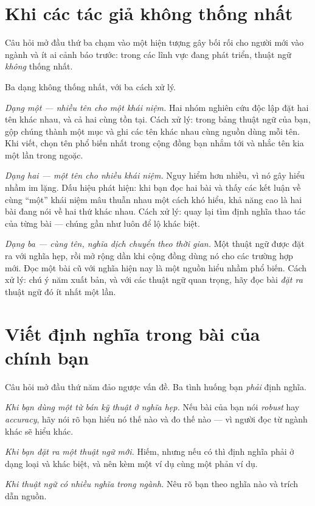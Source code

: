 \documentclass[../../english.tex]{subfiles}
\begin{document}
\section{Khi các tác giả không thống nhất}

Câu hỏi mở đầu thứ ba chạm vào một hiện tượng gây bối rối cho người mới vào ngành và ít ai cảnh báo trước: trong các lĩnh vực đang phát triển, thuật ngữ \emph{không} thống nhất.

Ba dạng không thống nhất, với ba cách xử lý.

\emph{Dạng một --- nhiều tên cho một khái niệm.} Hai nhóm nghiên cứu độc lập đặt hai tên khác nhau, và cả hai cùng tồn tại. Cách xử lý: trong bảng thuật ngữ của bạn, gộp chúng thành một mục và ghi các tên khác nhau cùng nguồn dùng mỗi tên. Khi viết, chọn tên phổ biến nhất trong cộng đồng bạn nhắm tới và nhắc tên kia một lần trong ngoặc.

\emph{Dạng hai --- một tên cho nhiều khái niệm.} Nguy hiểm hơn nhiều, vì nó gây hiểu nhầm im lặng. Dấu hiệu phát hiện: khi bạn đọc hai bài và thấy các kết luận về cùng ``một'' khái niệm mâu thuẫn nhau một cách khó hiểu, khả năng cao là hai bài đang nói về hai thứ khác nhau. Cách xử lý: quay lại tìm định nghĩa thao tác của từng bài --- chúng gần như luôn để lộ khác biệt.

\emph{Dạng ba --- cùng tên, nghĩa dịch chuyển theo thời gian.} Một thuật ngữ được đặt ra với nghĩa hẹp, rồi mở rộng dần khi cộng đồng dùng nó cho các trường hợp mới. Đọc một bài cũ với nghĩa hiện nay là một nguồn hiểu nhầm phổ biến. Cách xử lý: chú ý năm xuất bản, và với các thuật ngữ quan trọng, hãy đọc bài \emph{đặt ra} thuật ngữ đó ít nhất một lần.

\section{Viết định nghĩa trong bài của chính bạn}

Câu hỏi mở đầu thứ năm đảo ngược vấn đề. Ba tình huống bạn \emph{phải} định nghĩa.

\emph{Khi bạn dùng một từ bán kỹ thuật ở nghĩa hẹp.} Nếu bài của bạn nói \emph{robust} hay \emph{accuracy}, hãy nói rõ bạn hiểu nó thế nào và đo thế nào --- vì người đọc từ ngành khác sẽ hiểu khác.

\emph{Khi bạn đặt ra một thuật ngữ mới.} Hiếm, nhưng nếu có thì định nghĩa phải ở dạng loại và khác biệt, và nên kèm một ví dụ cùng một phản ví dụ.

\emph{Khi thuật ngữ có nhiều nghĩa trong ngành.} Nêu rõ bạn theo nghĩa nào và trích dẫn nguồn.
\end{document}
